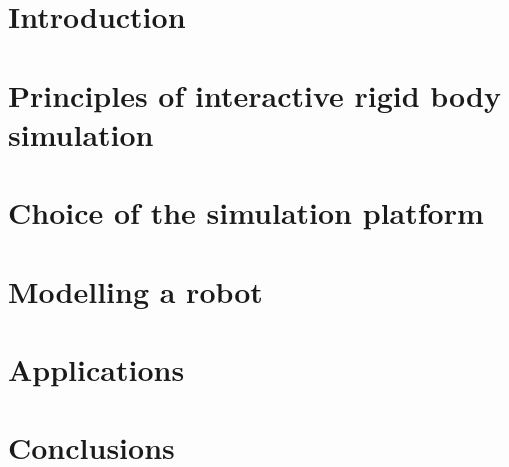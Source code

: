 \documentclass[12pt,a4paper,twoside]{report}
\begin{document}


\tableofcontents

\listoffigures

\listoftables

\newpage\null\thispagestyle{empty}\newpage
\setcounter{page}{1}
\chapter{Introduction}


\newpage\null\newpage
\chapter{Principles of interactive rigid body simulation}
\label{chap:principles}


\clearpage
\newpage
\chapter{Choice of the simulation platform}
\label{chap:choice}


\chapter{Modelling a robot}
\label{chap:modelling}


\newpage\null\newpage
\chapter{Applications}
\label{chap:simulation}


\chapter{Conclusions}
\label{chap:conclusion}





\appendix
\newpage\null\newpage

\end{document}
